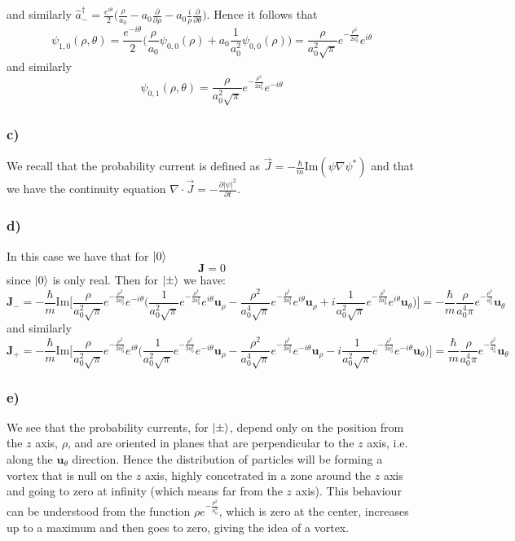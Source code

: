 \documentclass[10pt,a4paper]{book}
\newcommand{\p}{\partial}
\begin{document}
and similarly $\hat{a}_-^{\dagger}=\frac{e^{i\theta}}{2}\big(\frac{\rho}{a_0}-a_0\frac{\p}{\p\rho}-a_0\frac{i}{\rho}\frac{\p}{\p\theta}\big)$.
Hence it follows that 
$$\psi_{1,0}(\rho,\theta)=\frac{e^{-i\theta}}{2}\bigg(\frac{\rho}{a_0}\psi_{0,0}(\rho)+a_0\frac{1}{a_0^2}\psi_{0,0}(\rho)\bigg)=\frac{\rho}{a_0^2\sqrt{\pi}}e^{-\frac{\rho^2}{2a_0^2}}e^{i\theta}$$
and similarly 
$$\psi_{0,1}(\rho,\theta)=\frac{\rho}{a_0^2\sqrt{\pi}}e^{-\frac{\rho^2}{2a_0^2}}e^{-i\theta}$$

\subsubsection*{c)}
We recall that the probability current is defined as $\vec{J}=-\frac{\hbar}{m}\text{Im}(\psi\nabla\psi^{*})$ and that we have the continuity equation $\nabla \cdot \vec{J}=-\frac{\p|\psi|^2}{\p t}$.

\subsubsection*{d)}

In this case we have that for $\ket{0}$
$$\mathbf{J}=0$$ since $\ket{0}$ is only real. Then for $\ket{\pm}$ we have:
$$\mathbf{J}_-=-\frac{\hbar}{m}\text{Im}\bigg[\frac{\rho}{a_0^2\sqrt{\pi}}e^{-\frac{\rho^2}{2a_0^2}}e^{-i\theta}\bigg(\frac{1}{a_0^2\sqrt{\pi}}e^{-\frac{\rho^2}{2a_0^2}}e^{i\theta}\mathbf{u}_{\rho}-\frac{\rho^2}{a_0^4\sqrt{\pi}}e^{-\frac{\rho^2}{2a_0^2}}e^{i\theta}\mathbf{u}_{\rho}+i\frac{1}{a_0^2\sqrt{\pi}}e^{-\frac{\rho^2}{2a_0^2}}e^{i\theta}\mathbf{u}_{\theta}\bigg)\bigg]=-\frac{\hbar}{m}\frac{\rho}{a_0^4\pi}e^{-\frac{\rho^2}{a_0^2}}\mathbf{u}_{\theta}$$
and similarly
$$\mathbf{J}_+=-\frac{\hbar}{m}\text{Im}\bigg[\frac{\rho}{a_0^2\sqrt{\pi}}e^{-\frac{\rho^2}{2a_0^2}}e^{i\theta}\bigg(\frac{1}{a_0^2\sqrt{\pi}}e^{-\frac{\rho^2}{2a_0^2}}e^{-i\theta}\mathbf{u}_{\rho}-\frac{\rho^2}{a_0^4\sqrt{\pi}}e^{-\frac{\rho^2}{2a_0^2}}e^{-i\theta}\mathbf{u}_{\rho}-i\frac{1}{a_0^2\sqrt{\pi}}e^{-\frac{\rho^2}{2a_0^2}}e^{-i\theta}\mathbf{u}_{\theta}\bigg)\bigg]=\frac{\hbar}{m}\frac{\rho}{a_0^4\pi}e^{-\frac{\rho^2}{a_0^2}}\mathbf{u}_{\theta}$$


\subsubsection*{e)}

We see that the probability currents, for $\ket{\pm}$, depend only on the position from the $z$ axis, $\rho$, and are oriented in planes that are perpendicular to the $z$ axis, i.e. along the $\mathbf{u}_{\theta}$ direction. Hence the distribution of particles will be forming a vortex that is null on the $z$ axis, highly concetrated in a zone around the $z$ axis and going to zero at infinity (which means far from the $z$ axis). This behaviour can be understood from the function $\rho e^{-\frac{\rho^2}{a_0^2}}$, which is zero at the center, increases up to a maximum and then goes to zero, giving the idea of a vortex.
\end{document}
